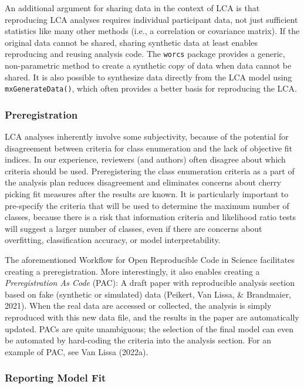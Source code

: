 \documentclass[
  ,man,floatsintext]{apa6}
\begin{document}
An additional argument for sharing data in the context of LCA is that reproducing LCA analyses requires individual participant data,
not just sufficient statistics like many other methods (i.e., a correlation or covariance matrix).
If the original data cannot be shared,
sharing synthetic data at least enables reproducing and reusing analysis code.
The \texttt{worcs} package provides a generic, non-parametric method to create a synthetic copy of data when data cannot be shared.
It is also possible to synthesize data directly from the LCA model using \texttt{mxGenerateData()},
which often provides a better basis for reproducing the LCA.

\hypertarget{preregistration}{%
\subsubsection{Preregistration}\label{preregistration}}

LCA analyses inherently involve some subjectivity,
because of the potential for disagreement between criteria for class enumeration and the lack of objective fit indices.
In our experience, reviewers (and authors) often disagree about which criteria should be used.
Preregistering the class enumeration criteria as a part of the analysis plan reduces disagreement and eliminates concerns about cherry picking fit measures after the results are known.
It is particularly important to pre-specify the criteria that will be used to determine the maximum number of classes,
because there is a risk that information criteria and likelihood ratio tests will suggest a larger number of classes, even if there are concerns about overfitting, classification accuracy, or model interpretability.

The aforementioned Workflow for Open Reproducible Code in Science facilitates creating a preregistration.
More interestingly, it also enables creating a \emph{Preregistration As Code} (PAC):
A draft paper with reproducible analysis section based on fake (synthetic or simulated) data (Peikert, Van Lissa, \& Brandmaier, 2021).
When the real data are accessed or collected,
the analysis is simply reproduced with this new data file,
and the results in the paper are automatically updated.
PACs are quite unambiguous; the selection of the final model can even be automated by hard-coding the criteria into the analysis section.
For an example of PAC, see Van Lissa (2022a).

\hypertarget{reporting-model-fit}{%
\subsubsection{Reporting Model Fit}\label{reporting-model-fit}}
\end{document}

